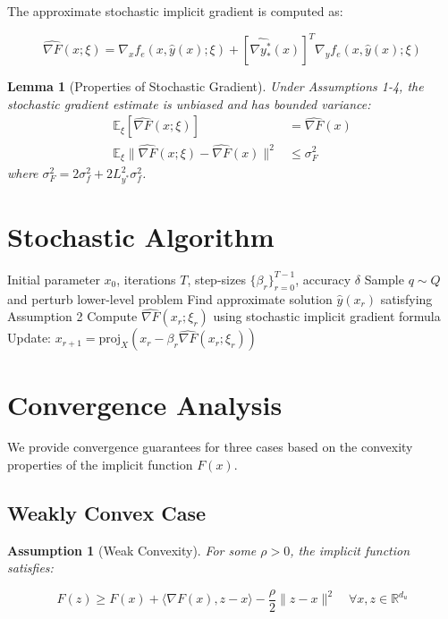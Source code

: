 \documentclass[11pt]{article}
\newtheorem{lemma}{Lemma}
\newtheorem{assumption}{Assumption}
\begin{document}
The approximate stochastic implicit gradient is computed as:

$$
\widehat{\nabla F}(x; \xi) = \nabla_x f_e(x, \hat{y}(x); \xi) + [\widehat{\nabla y_*^*}(x)]^T \nabla_y f_e(x, \hat{y}(x); \xi)
$$

\begin{lemma}[Properties of Stochastic Gradient]
Under Assumptions 1-4, the stochastic gradient estimate is unbiased and has bounded variance:
\begin{align}
\mathbb{E}_\xi[\widehat{\nabla F}(x; \xi)] &= \widehat{\nabla F}(x)\\
\mathbb{E}_\xi\|\widehat{\nabla F}(x; \xi) - \widehat{\nabla F}(x)\|^2 &\leq \sigma_F^2
\end{align}
where $\sigma_F^2 = 2\sigma_f^2 + 2L_{y^*}^2 \sigma_f^2$.
\end{lemma}

\section{Stochastic Algorithm}

\begin{algorithm}
\caption{Stochastic Smoothed Implicit Gradient Descent (SSIGD)}
\begin{algorithmic}[1]
\REQUIRE Initial parameter $x_0$, iterations $T$, step-sizes $\{\beta_r\}_{r=0}^{T-1}$, accuracy $\delta$
\STATE Sample $q \sim Q$ and perturb lower-level problem
    \STATE Find approximate solution $\hat{y}(x_r)$ satisfying Assumption 2
    \STATE Compute $\widehat{\nabla F}(x_r; \xi_r)$ using stochastic implicit gradient formula
    \STATE Update: $x_{r+1} = \text{proj}_X(x_r - \beta_r \widehat{\nabla F}(x_r; \xi_r))$
\ENDFOR
\end{algorithmic}
\end{algorithm}

\section{Convergence Analysis}

We provide convergence guarantees for three cases based on the convexity properties of the implicit function $F(x)$.

\subsection{Weakly Convex Case}

\begin{assumption}[Weak Convexity]
For some $\rho > 0$, the implicit function satisfies:

$$
F(z) \geq F(x) + \langle\nabla F(x), z - x\rangle - \frac{\rho}{2}\|z - x\|^2 \quad \forall x, z \in \mathbb{R}^{d_u}
$$

\end{assumption}
\end{document}
